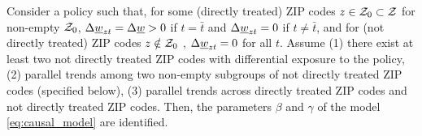 \begin{prop}[Identification]\label{prop:diS_id}
    Consider a policy such that, 
    for some (directly treated) ZIP codes  $z\in\mathcal{Z}_0\subset\mathcal{Z}$ for non-empty $\mathcal{Z}_0$,
        $\Delta\underline{w}_{zt}=\Delta\underline{w}>0$ if $t=\bar{t}$ and
        $\Delta\underline{w}_{zt}=0$           if $t\neq\bar{t}$,
    and for (not directly treated) ZIP codes $z\notin\mathcal{Z}_0$ ,
        $\Delta\underline{w}_{zt}=0$ for all $t$.
    Assume
    (1) there exist at least two not directly treated ZIP codes with differential 
    exposure to the policy, 
    (2) parallel trends among two non-empty subgroups of not directly treated 
    ZIP codes (specified below),
    (3) parallel trends across directly treated ZIP codes and not directly 
    treated ZIP codes.
    Then, the parameters $\beta$ and $\gamma$ of the model 
    \eqref{eq:causal_model} are identified.
\end{prop}

